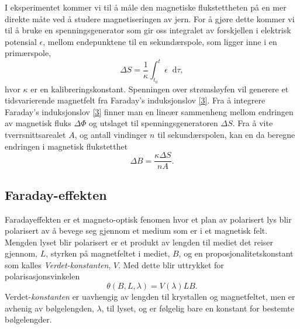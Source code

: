 \documentclass[%
 reprint,
 amsmath,amssymb,
 aps,
 norsk,
]{revtex4-1}
\newcommand*\diff{\mathop{}\!\mathrm{d}}
\begin{document}
\par
I eksperimentet kommer vi til å måle den magnetiske flukstettheten på en mer direkte måte ved å studere magnetiseringen av jern. For å gjøre dette kommer vi til å bruke en spenningsgenerator som gir oss integralet av forskjellen i elektrisk potensial $\epsilon$, mellom endepunktene til en sekundærspole, som ligger inne i en primærspole,
\begin{equation*}
  \Delta S = \frac{1}{\kappa}\int_{t_0}^{t}\epsilon \diff \tau, \label{deltas}
\end{equation*}
hvor $\kappa$ er en kalibreringskonstant. Spenningen over strømsløyfen vil generere et tidsvarierende magnetfelt fra Faraday's induksjonslov \eqref{3}. Fra å integrere Faraday's induksjonslov \eqref{3} finner man en lineær sammenheng mellom endringen av magnetisk fluks $\Delta \Phi$ og utslaget til spenningsgeneratoren $\Delta S$. Fra å vite tverrsnittsarealet $A$, og antall vindinger $n$ til sekundærspolen, kan en da beregne endringen i magnetisk flukstetthet
\begin{equation}
  \Delta B = \frac{\kappa\Delta S}{nA}.\label{deltab}
\end{equation}
\subsection{Faraday-effekten}
Faradayeffekten er et magneto-optisk fenomen hvor et plan av polarisert lys blir polarisert av å bevege seg gjennom et medium som er i et magnetisk felt. Mengden lyset blir polarisert er et produkt av lengden til mediet det reiser gjennom, $L$, styrken på magnetfeltet i mediet, $B$, og en proposjonalitetskonstant som kalles \textit{Verdet-konstanten}, $V$. Med dette blir uttrykket for polarisasjonsvinkelen
\begin{equation}
  \theta\left(B, L, \lambda\right) = V\left(\lambda\right)LB.\label{verdet}
\end{equation}
Verdet-\textit{konstanten} er uavhengig av lengden til krystallen og magnetfeltet, men er avhenig av bølgelengden, $\lambda$, til lyset, og er følgelig bare en konstant for bestemte bølgelengder.\\
\end{document}
